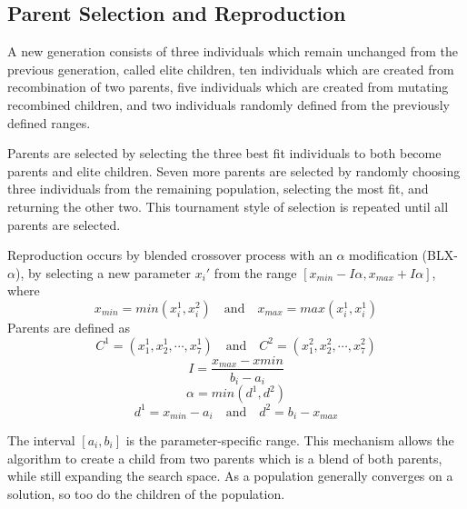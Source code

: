 \documentclass[submit]{aiaa-tc}%
\begin{document}
\subsection{Parent Selection and Reproduction}
A new generation consists of three individuals which remain unchanged from the previous generation, called elite children, ten individuals which are created from recombination of two parents, five individuals which are created from mutating recombined children, and two individuals randomly defined from the previously defined ranges.

Parents are selected by selecting the three best fit individuals to both become parents and elite children. Seven more parents are selected by randomly choosing three individuals from the remaining population, selecting the most fit, and returning the other two. This tournament style of selection is repeated until all parents are selected.

Reproduction occurs by blended crossover process with an $\alpha$ modification (BLX-$\alpha$), by selecting a new parameter $x_i'$ from the range $[x_{min}-I\alpha,x_{max}+I\alpha]$, where
\begin{displaymath}
x_{min}=min(x_i^1,x_i^2)\quad \mathrm{and} \quad x_{max}=max(x_i^1,x_i^1)
\end{displaymath}
Parents are defined as
\begin{displaymath}
C^1=(x_1^1,x_2^1,\cdots,x_7^1)\quad\mathrm{and}\quad C^2=(x_1^2,x_2^2,\cdots,x_7^2)
\end{displaymath}
\begin{displaymath}
I=\frac{x_{max}-x{min}}{b_i-a_i}
\end{displaymath}
\begin{displaymath}
\alpha=min(d^1,d^2)
\end{displaymath}
\begin{displaymath}
d^1=x_{min}-a_i\quad\mathrm{and}\quad d^2=b_i-x_{max}
\end{displaymath}

The interval $[a_i,b_i]$ is the parameter-specific range. This mechanism allows the algorithm to create a child from two parents which is a blend of both parents, while still expanding the search space. As a population generally converges on a solution, so too do the children of the population.
\end{document}
